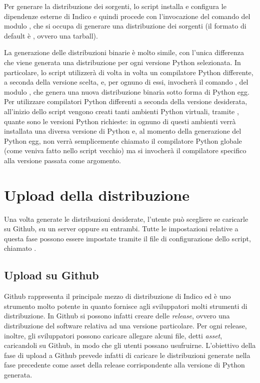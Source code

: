         Per generare la distribuzione dei sorgenti, lo script installa e configura le dipendenze esterne di Indico e quindi procede con l'invocazione del comando  del modulo  \cite{python:sdist}, che si occupa di generare una distribuzione dei sorgenti (il formato di default è , ovvero una tarball).
        
        La generazione delle distribuzioni binarie è molto simile, con l'unica differenza che viene generata una distribuzione per ogni versione Python selezionata. In particolare, lo script utilizzerà di volta in volta un compilatore Python differente, a seconda della versione scelta, e, per ognuno di essi, invocherà il comando , del modulo  \cite{python:bdist}, che genera una nuova distribuzione binaria sotto forma di Python egg. Per utilizzare compilatori Python differenti a seconda della versione desiderata, all'inizio dello script vengono creati tanti ambienti Python virtuali, tramite , quante sono le versioni Python richieste: in ognuno di questi ambienti verrà installata una diversa versione di Python e, al momento della generazione del Python egg, non verrà semplicemente chiamato il compilatore Python globale (come veniva fatto nello script vecchio) ma si invocherà il compilatore specifico alla versione passata come argomento.
    
    \section{Upload della distribuzione} \label{sec:dp;upload_distribuzione}
    
        Una volta generate le distribuzioni desiderate, l'utente può scegliere se caricarle su Github, su un server oppure su entrambi. Tutte le impostazioni relative a questa fase possono essere impostate tramite il file di configurazione dello script, chiamato .
        
        \subsection{Upload su Github} \label{subsec:dp;ud;upload_github}
        
            Github rappresenta il principale mezzo di distribuzione di Indico ed è uno strumento molto potente in quanto fornisce agli sviluppatori molti strumenti di distribuzione. In Github si possono infatti creare delle \textit{release}, ovvero una distribuzione del software relativa ad una versione particolare. Per ogni release, inoltre, gli sviluppatori possono caricare allegare alcuni file, detti \textit{asset}, caricandoli su Github, in modo che gli utenti possano usufruirne. L'obiettivo della fase di upload a Github prevede infatti di caricare le distribuzioni generate nella fase precedente come asset della release corrispondente alla versione di Python generata.
            
